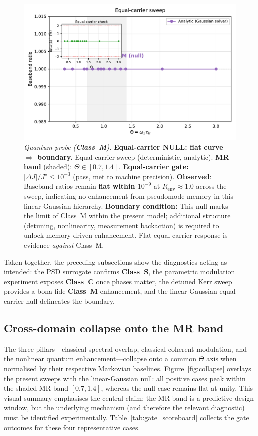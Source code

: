 \documentclass[11pt,letterpaper]{article}
\DeclareRobustCommand{\classS}{\textbf{Class~S}\xspace}
\DeclareRobustCommand{\classC}{\textbf{Class~C}\xspace}
\DeclareRobustCommand{\classM}{\textbf{Class~M}\xspace}
\begin{document}
\begin{figure}[t]
\centering
\includegraphics[width=0.8\linewidth]{figB_equal_carrier.pdf}
\caption{\label{fig:eqcarrier_null}\emph{Quantum probe (\classM).} \textbf{Equal-carrier NULL: flat curve $\Rightarrow$ boundary.} Equal-carrier sweep (deterministic, analytic). \textbf{MR band} (shaded): $\Theta\in[0.7,1.4]$. \textbf{Equal-carrier gate:} $|\Delta J|/J^\star\le 10^{-3}$ (pass, met to machine precision). \textbf{Observed}: Baseband ratios remain \textbf{flat within $10^{-9}$} at $R_{\mathrm{env}}\approx 1.0$ across the sweep, indicating no enhancement from pseudomode memory in this linear-Gaussian hierarchy. \textbf{Boundary condition:} This null marks the limit of Class~M within the present model; additional structure (detuning, nonlinearity, measurement backaction) is required to unlock memory-driven enhancement. Flat equal-carrier response is evidence \emph{against} Class~M.}
\end{figure}

Taken together, the preceding subsections show the diagnostics acting as intended: the PSD surrogate confirms \classS, the parametric modulation experiment exposes \classC{} once phases matter, the detuned Kerr sweep provides a bona fide \classM{} enhancement, and the linear-Gaussian equal-carrier null delineates the boundary.

\subsection{Cross-domain collapse onto the MR band}
The three pillars---classical spectral overlap, classical coherent modulation, and the nonlinear quantum enhancement---collapse onto a common $\Theta$ axis when normalised by their respective Markovian baselines. Figure~\ref{fig:collapse} overlays the present sweeps with the linear-Gaussian null: all positive cases peak within the shaded MR band $[0.7,1.4]$, whereas the null case remains flat at unity. This visual summary emphasises the central claim: the MR band is a predictive design window, but the underlying mechanism (and therefore the relevant diagnostic) must be identified experimentally. Table~\ref{tab:gate_scoreboard} collects the gate outcomes for these four representative cases.
\end{document}
